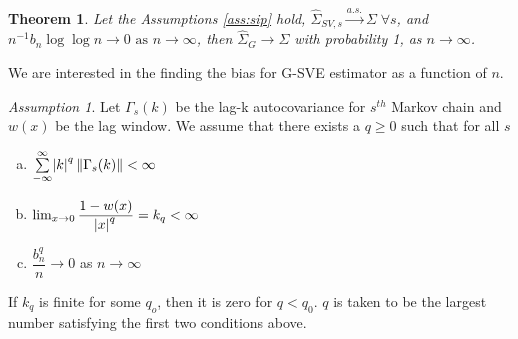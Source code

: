 \documentclass[11pt]{article}
\newtheorem{theorem}{Theorem}
\theoremstyle{remark}
\newtheorem{ass}{Assumption}
\begin{document}
\begin{theorem}
\label{th:consistency}
 Let the Assumptions \ref{ass:sip} hold, $\hat{\Sigma}_{SV,s} \xrightarrow{a.s.} \Sigma \; \forall s$, and $n^{-1}{b_n \log \log n} \to 0 \textrm{ as } n \to \infty$, then $\hat{\Sigma}_{G} \to \Sigma$ with probability 1, as $n \to \infty$.
\end{theorem} 





We are interested in the finding the bias for G-SVE estimator as a function of $n$. 
\begin{ass} \label{ass:bias}
    Let $\Gamma_s(k)$ be the lag-k autocovariance for $s^{th}$ Markov chain and $w(x)$ be the lag window. We assume that there exists a $q \geq 0$ such that for all $s$
    \begin{enumerate} [a.]
        \item $\sum\limits_{-\infty}^{\infty}\abs{k}^q \|\Gamma_s(k)\| < \infty$
        \item $\lim _{x \to 0}\dfrac{1 - w(x)}{\abs{x}^q} = k_q < \infty$
        \item $\dfrac{b_n^q}{n} \to 0$ as $n \to \infty$
    \end{enumerate}
    
    If $k_q$ is finite for some $q_o$, then it is zero for $q < q_0$. $q$ is taken to be the largest number satisfying the first two conditions above.
\end{ass}
\end{document}
